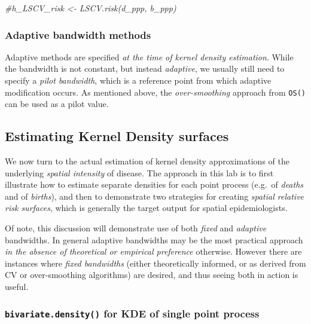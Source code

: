 \documentclass[
]{book}
\newenvironment{Shaded}{\begin{snugshade}}{\end{snugshade}}
\newcommand{\CommentTok}[1]{\textcolor[rgb]{0.56,0.35,0.01}{\textit{#1}}}
\begin{document}
\begin{Shaded}
\begin{Highlighting}[]
\CommentTok{\#h\_LSCV\_risk \textless{}{-} LSCV.risk(d\_ppp, b\_ppp)}
\end{Highlighting}
\end{Shaded}

\hypertarget{adaptive-bandwidth-methods}{%
\subsubsection{Adaptive bandwidth methods}\label{adaptive-bandwidth-methods}}

Adaptive methods are specified \emph{at the time of kernel density estimation}. While the bandwidth is not constant, but instead \emph{adaptive}, we usually still need to specify a \emph{pilot bandwidth}, which is a reference point from which adaptive modification occurs. As mentioned above, the \emph{over-smoothing} approach from \texttt{OS()} can be used as a pilot value.

\hypertarget{estimating-kernel-density-surfaces}{%
\subsection{Estimating Kernel Density surfaces}\label{estimating-kernel-density-surfaces}}

We now turn to the actual estimation of kernel density approximations of the underlying \emph{spatial intensity} of disease. The approach in this lab is to first illustrate how to estimate separate densities for each point process (e.g.~of \emph{deaths} and of \emph{births}), and then to demonstrate two strategies for creating \emph{spatial relative risk surfaces}, which is generally the target output for spatial epidemiologists.

Of note, this discussion will demonstrate use of both \emph{fixed} and \emph{adaptive} bandwidths. In general adaptive bandwidths may be the most practical approach \emph{in the absence of theoretical or empirical preference} otherwise. However there are instances where \emph{fixed bandwidths} (either theoretically informed, or as derived from CV or over-smoothing algorithms) are desired, and thus seeing both in action is useful.

\hypertarget{bivariate.density-for-kde-of-single-point-process}{%
\subsubsection{\texorpdfstring{\texttt{bivariate.density()} for KDE of single point process}{bivariate.density() for KDE of single point process}}\label{bivariate.density-for-kde-of-single-point-process}}
\end{document}
